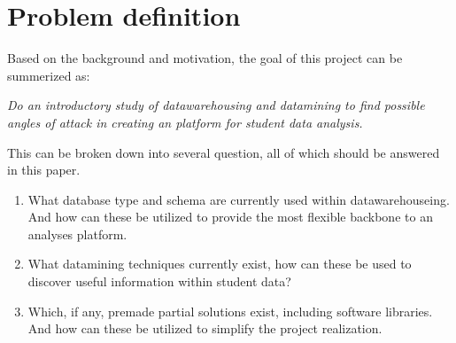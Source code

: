 \section{Problem definition}
	Based on the background and motivation, the goal of this project can be summerized as: 
	
	
	\textit{Do an introductory study of datawarehousing and datamining to find possible angles of attack in
	creating an platform for student data analysis. }\newline
	
	This can be broken down into several question, all of which should be answered in this paper.
	
	\begin{enumerate}
		\item What database type and schema are currently used within datawarehouseing. 
			And how can these be utilized to provide the most flexible backbone to an analyses platform.
		\item What datamining techniques currently exist, how can these be used to discover useful information
		within student data?
		\item Which, if any, premade partial solutions exist, including software libraries. 
		And how can these be utilized to simplify the project realization.
	\end{enumerate}